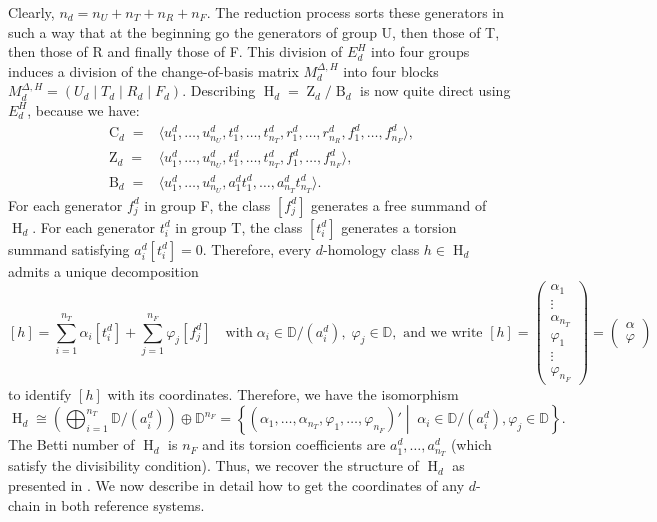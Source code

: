 \documentclass[a4paper,10pt]{article}
\newcommand{\bbd}{\mathbb{D}}
\newcommand{\mdh}{M^{\Delta,H}}
\DeclareMathOperator{\Co}{C}
\DeclareMathOperator{\Zo}{Z}
\DeclareMathOperator{\Bo}{B}
\DeclareMathOperator{\Ho}{H}
\begin{document}
Clearly, \(n_d = n_{U} + n_{T} + n_{R} + n_{F}\). The reduction process sorts these generators in such a way that at the beginning go the generators of group U, then those of T, then those of R and finally those of F. This division of \(E^{H}_d\) into four groups induces a division of the change-of-basis matrix \(\mdh_d\) into four blocks 
\(\mdh_d = \left(U_d \mid T_d \mid R_d \mid F_d \right)\). Describing \(\Ho_d = \Zo_d /\Bo_d\) is now quite direct using \(E^{H}_d\), because we have:
\begin{align*}
\Co_d = & \langle u^d_1,\ldots,u^d_{n_U}, t^d_1,\ldots,t^d_{n_T}, r^d_1,\ldots,r^d_{n_R}, f^d_1,\ldots,f^d_{n_F} \rangle, \\    
\Zo_d = & \langle u^d_1,\ldots,u^d_{n_U}, t^d_1,\ldots,t^d_{n_T}, f^d_1,\ldots,f^d_{n_F} \rangle, \\  
\Bo_d = & \langle u^d_1,\ldots,u^d_{n_U}, a^{d}_{1}t^{d}_{1},\dots, a^{d}_{n_T}t^{d}_{n_T} \rangle.
\end{align*}
For each generator \(f^d_j\) in group F, the class \([f^d_j]\) generates a free summand of \(\Ho_d\). 
For each generator \(t^d_i\) in group T, the class \([t^d_i]\) generates a torsion summand satisfying \(a^d_i [t^d_i] = 0\).
Therefore, every \(d\)-homology class \(h \in \Ho_d\) admits a unique decomposition
\[
[h] =
\sum_{i=1}^{n_T} \alpha_i [t^d_i]
+
\sum_{j=1}^{n_F} \varphi_j [f^d_j]
\quad \text{with} \;
\alpha_i \in \bbd/(a^d_i), \; \varphi_j \in \bbd, \text{ and we write }
[h] =
\left(
\begin{array}{c}
\alpha_1\\
\vdots \\
\alpha_{n_T} \\
\varphi_1 \\
\vdots \\
\varphi_{n_F}
\end{array}
\right)
=
\left(
\begin{array}{c}
\alpha\\
\varphi
\end{array}
\right)
\]
to identify \([h]\) with its coordinates.
Therefore, we have the isomorphism
\[
\Ho_d \cong 
\left(\bigoplus_{i=1}^{n_T} \bbd/(a^d_i)\right)
\oplus
\bbd^{n_F} = \left\{(\alpha_{1},\dots,\alpha_{n_T}, \varphi_{1},\dots,\varphi_{n_F})' 
\middle| \; \alpha_{i} \in \bbd/(a^{d}_{i}), \varphi_{j} \in \bbd\right\}.
\]
The Betti number of \(\Ho_d\) is \(n_F\) and its torsion coefficients are \(a^{d}_{1},\ldots,a^{d}_{n_T}\) (which satisfy the divisibility condition). Thus, we recover the structure of $\Ho_d$ as presented in . We now describe in detail how to get the coordinates of any \(d\)-chain in both reference systems. 
\end{document}
